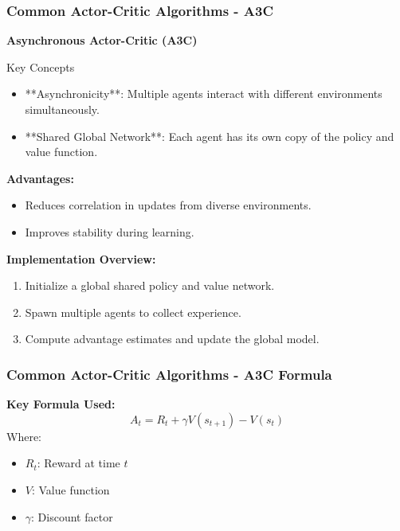 \documentclass[aspectratio=169]{beamer}
\begin{document}
\begin{frame}[fragile]
    \frametitle{Common Actor-Critic Algorithms - A3C}
    \textbf{Asynchronous Actor-Critic (A3C)}
    \begin{block}{Key Concepts}
        \begin{itemize}
            \item **Asynchronicity**: Multiple agents interact with different environments simultaneously.
            \item **Shared Global Network**: Each agent has its own copy of the policy and value function.
        \end{itemize}
    \end{block}
    
    \textbf{Advantages:}
    \begin{itemize}
        \item Reduces correlation in updates from diverse environments.
        \item Improves stability during learning.
    \end{itemize}
    
    \textbf{Implementation Overview:}
    \begin{enumerate}
        \item Initialize a global shared policy and value network.
        \item Spawn multiple agents to collect experience.
        \item Compute advantage estimates and update the global model.
    \end{enumerate}
\end{frame}

\begin{frame}[fragile]
    \frametitle{Common Actor-Critic Algorithms - A3C Formula}
    \textbf{Key Formula Used:}
    \begin{equation}
        A_t = R_t + \gamma V(s_{t+1}) - V(s_t)
    \end{equation}
    Where:
    \begin{itemize}
        \item \( R_t \): Reward at time \( t \)
        \item \( V \): Value function
        \item \( \gamma \): Discount factor
    \end{itemize}
\end{frame}
\end{document}
